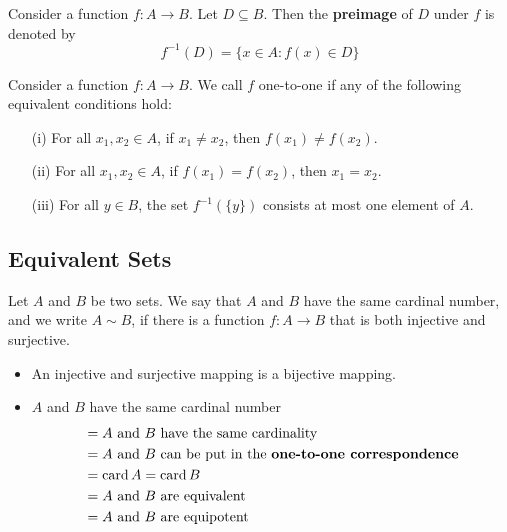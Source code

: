 \documentclass[a4paper]{report}
\begin{document}
\begin{definition}[Preimage]
    Consider a function \( f: A \to B  \). Let \( D \subseteq B  \). Then the \textbf{preimage} of \( D  \) under \( f  \) is denoted by 
    \[  f^{-1}(D) = \{ x \in A : f(x) \in D  \}  \]
\end{definition}

\begin{definition}
   Consider a function \( f: A \to B  \). We call \( f  \) one-to-one if any of the following equivalent conditions hold:  
   \begin{enumerate}
       \item[(i)] For all \( {x}_{1}, {x}_{2} \in A  \), if \( {x}_{1} \neq {x}_{2}  \), then \( f({x}_{1}) \neq f({x}_{2}) \).
        \item[(ii)] For all \( {x}_{1}, {x}_{2} \in A  \), if \( f({x}_{1}) = f({x}_{2})  \), then \( {x}_{1} = {x}_{2} \).
        \item[(iii)] For all \( y \in B \), the set \( f^{-1}(\{ y \} ) \) consists at most one element of \( A  \).
   \end{enumerate}
\end{definition}


\subsection{Equivalent Sets}

\begin{definition}[ ]
   Let \( A  \) and \( B  \) be two sets. We say that \( A  \) and \( B  \) have the same cardinal number, and we write \( A \sim B  \), if there is a function \( f: A \to B  \) that is both injective and surjective.
\end{definition}

\begin{remark}
    \begin{itemize}
        \item An injective and surjective mapping is a bijective mapping.
        \item \( A  \) and \( B  \) have the same cardinal number 
            \begin{align*}
                &= A \  \text{and} \ B \ \text{have the same cardinality} \\
                &= A \  \text{and} \ B \ \text{can be put in the \textbf{one-to-one correspondence}} \\
                &= \operatorname{card}{A} = \operatorname{card}{B} \\
                &= A \  \text{and} \ B \ \text{are equivalent} \\
                &= A \  \text{and} \ B \ \text{are equipotent} \\
            \end{align*}
    \end{itemize}
\end{remark}
\end{document}
